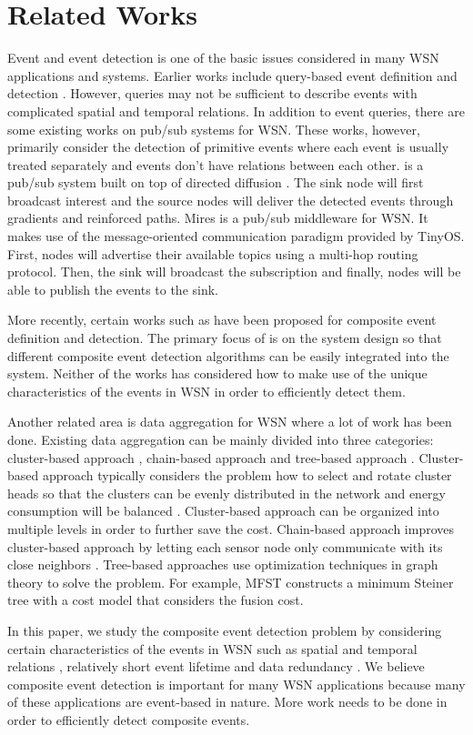 \section{Related Works}
\label{sec:relatedworks}
Event and event detection is one of the basic issues considered in many WSN applications and systems. Earlier works include query-based event definition and detection \cite{reed}. However, queries may not be sufficient to describe events with complicated spatial and temporal relations. In addition to event queries, there are some existing works on pub/sub systems for WSN. These works, however, primarily consider the detection of primitive events where each event is usually treated separately and events don't have relations between each other. \cite{lowlevelnaming} is a pub/sub system built on top of directed diffusion \cite{directeddiffusion}. The sink node will first broadcast interest and the source nodes will deliver the detected events through gradients and reinforced paths. Mires \cite{mires} is a pub/sub middleware for WSN. It makes use of the message-oriented communication paradigm provided by TinyOS. First, nodes will advertise their available topics using a multi-hop routing protocol. Then, the sink will broadcast the subscription and finally, nodes will be able to publish the events to the sink.

More recently, certain works such as \cite{lai:psware, ahn:proactive} have been proposed for composite event definition and detection. The primary focus of \cite{lai:psware} is on the system design so that different composite event detection algorithms can be easily integrated into the system. Neither of the works has considered how to make use of the unique characteristics of the events in WSN in order to efficiently detect them.

Another related area is data aggregation for WSN where a lot of work has been done. Existing data aggregation can be mainly divided into three categories: cluster-based approach \cite{leach}, chain-based approach \cite{pegasis} and tree-based approach \cite{mfst, xue:lp}. Cluster-based approach typically considers the problem how to select and rotate cluster heads so that the clusters can be evenly distributed in the network and energy consumption will be balanced \cite{leach}. Cluster-based approach can be organized into multiple levels in order to further save the cost. Chain-based approach improves cluster-based approach by letting each sensor node only communicate with its close neighbors \cite{pegasis}. Tree-based approaches use optimization techniques in graph theory to solve the problem. For example, MFST \cite{mfst} constructs a minimum Steiner tree with a cost model that considers the fusion cost. 

In this paper, we study the composite event detection problem by considering certain characteristics of the events in WSN such as spatial and temporal relations \cite{li:tracking},  relatively short event lifetime and data redundancy \cite{bogdan:redundancy}. We believe composite event detection is important for many WSN applications because many of these applications are event-based in nature. More work needs to be done in order to efficiently detect composite events.